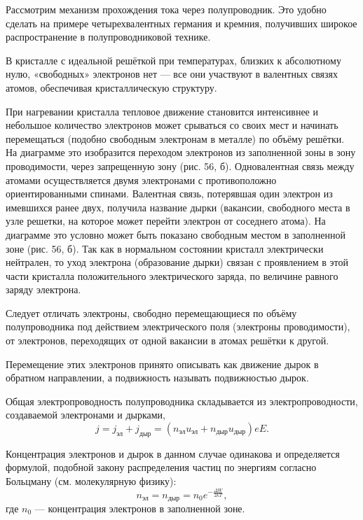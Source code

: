 \documentclass[a4paper,10pt]{book}
\begin{document}
Рассмотрим механизм прохождения тока через полупроводник. Это удобно сделать на примере четырехвалентных германия и кремния, получивших широкое распространение в полупроводниковой технике.

В кристалле с идеальной решёткой при температурах, близких к абсолютному нулю, «свободных» электронов нет — все они участвуют в валентных связях атомов, обеспечивая кристаллическую структуру.

При нагревании кристалла тепловое движение становится интенсивнее и небольшое количество электронов может срываться со  своих мест и начинать перемещаться (подобно свободным электронам в металле) по объёму решётки. На диаграмме это изобразится переходом электронов из заполненной зоны в зону проводимости, через запрещенную зону (рис. 56, $\textit{б}$). Одновалентная связь между атомами осуществляется двумя электронами с противоположно  ориентированными спинами. Валентная связь, потерявшая один электрон из имевшихся ранее двух, получила название дырки (вакансии, свободного места в узле решетки, на которое может перейти электрон от соседнего атома). На диаграмме это условно может быть показано свободным местом в заполненной зоне  (рис. 56, $\textit{б}$). Так как в нормальном состоянии кристалл электрически нейтрален, то уход электрона (образование дырки) связан с проявлением в этой части кристалла положительного электрического заряда, по величине равного заряду электрона.

Следует отличать электроны, свободно перемещающиеся по объёму полупроводника под действием электрического поля (электроны проводимости), от электронов, переходящих от одной вакансии в атомах решётки к другой.

Перемещение этих электронов принято описывать как движение дырок в обратном направлении, а подвижность называть подвижностью дырок.

Общая электропроводность полупроводника складывается из электропроводности, создаваемой электронами и дырками,\begin{equation}\label{25.2}
j = j_{\text{эл}} + j_{\text{дыр}} = (n_{\text{эл}}u_{\text{эл}} + n_{\text{дыр}}u_{\text{дыр}})eE.
\end{equation}

Концентрация электронов и дырок в данном случае одинакова и определяется формулой, подобной закону распределения частиц по энергиям согласно Больцману (см. молекулярную физику):
\begin{equation}\label{25.3}
n_{\text{эл}} = n_{\text{дыр}} =  n_0 e^{-\frac{\Delta W}{2kT}},
\end{equation}
где $n_0$ — концентрация электронов в заполненной зоне.
\end{document}
